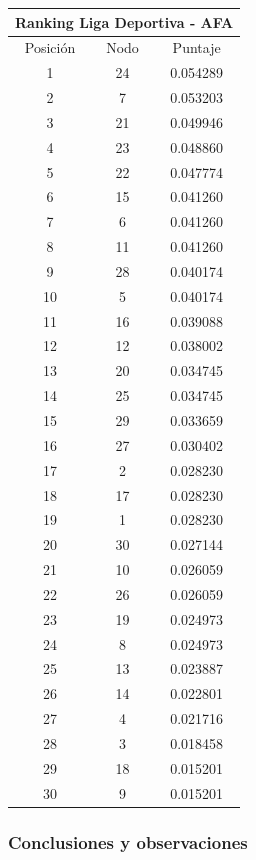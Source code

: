 \begin{center}
\begin{tabular}{|c|c|c|}
      			\end{tabular} 
      			    \begin{tabular}{|c|c|c|} 
		      		\hline
		  				\multicolumn{3}{c}{Ranking Liga Deportiva - AFA} \\
		 			\hline
        			Posición & Nodo & Puntaje \\ \hline
					    1 & 24 & 0.054289 \\
					    2 & 7 & 0.053203 \\
					    3 & 21 & 0.049946 \\
					    4 & 23 & 0.048860 \\
					    5 & 22 & 0.047774 \\
					    6 & 15 & 0.041260 \\
					    7 & 6 & 0.041260 \\
					    8 & 11 & 0.041260 \\
					    9 & 28 & 0.040174 \\
					   10 & 5 & 0.040174 \\
					   11 & 16 & 0.039088 \\
					   12 & 12 & 0.038002 \\
					   13 & 20 & 0.034745 \\
					   14 & 25 & 0.034745 \\
					   15 & 29 & 0.033659 \\
					   16 & 27 & 0.030402 \\
					   17 & 2 & 0.028230 \\
					   18 & 17 & 0.028230 \\
					   19 & 1 & 0.028230 \\
					   20 & 30 & 0.027144 \\
					   21 & 10 & 0.026059 \\
					   22 & 26 & 0.026059 \\
					   23 & 19 & 0.024973 \\
					   24 & 8 & 0.024973 \\
					   25 & 13 & 0.023887 \\
					   26 & 14 & 0.022801 \\
					   27 & 4 & 0.021716 \\
					   28 & 3 & 0.018458 \\
					   29 & 18 & 0.015201 \\
					   30 & 9 & 0.015201 \\

      			\end{tabular} 
      	\end{center}

		\subsubsection*{Conclusiones y observaciones} 

